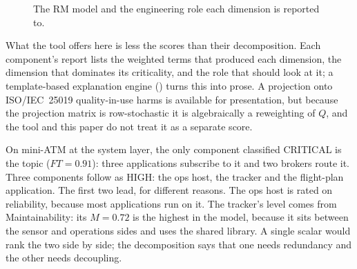 \begin{figure}[htbp]
\centering
{}
\caption{The RM model and the engineering role each dimension is reported to.}
\label{fig:rm_hierarchy}
\end{figure}

What the tool offers here is less the scores than their decomposition. Each component's report lists the weighted terms that produced each dimension, the dimension that dominates its criticality, and the role that should look at it; a template-based explanation engine () turns this into prose. A projection onto ISO/IEC~25019 quality-in-use harms is available for presentation, but because the projection matrix is row-stochastic it is algebraically a reweighting of $Q$, and the tool and this paper do not treat it as a separate score.

On mini-ATM at the system layer, the only component classified CRITICAL is the topic  ($FT = 0.91$): three applications subscribe to it and two brokers route it. Three components follow as HIGH: the ops host, the tracker and the flight-plan application. The first two lead, for different reasons. The ops host is rated on reliability, because most applications run on it. The tracker's level comes from Maintainability: its $M = 0.72$ is the highest in the model, because it sits between the sensor and operations sides and uses the shared library. A single scalar would rank the two side by side; the decomposition says that one needs redundancy and the other needs decoupling.

